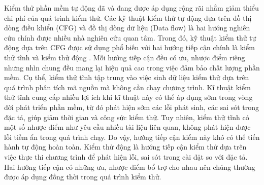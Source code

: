 Kiểm thử phần mềm tự động đã và đang được áp dụng rộng rãi nhằm giảm thiểu chi phí của quá trình kiểm thử. Các kỹ thuật kiểm thử tự động dựa trên đồ thị dòng điều khiển (CFG) và đồ thị dòng dữ liệu (Data flow) là hai hướng nghiên cứu chính được nhiều nhà nghiên cứu quan tâm. Trong đó, kỹ thuật kiểm thử tự động dựa trên CFG được sử dụng phổ biến với hai hướng tiếp cận chính là kiểm thử tĩnh \cite{WARD:1989:TheStaticAnalysisofSafetyCriticalSoftwareUsingMALPAS, SecureProgrammingWithStaticAnalysis, Wichmann:1995:Industrialperspectiveonstaticanalysis, Buckle:1998:StaticAnalysisofSafetyCriticalSoftwareTechniquesToolsandExperiences} và kiểm thử động \cite{Grigorenko:1998:DynamicTesting}. Mỗi hướng tiếp cận đều có ưu, nhược điểm riêng nhưng nhìn chung đều mang lại hiệu quả cao trong việc đảm bảo chất lượng phần mềm. Cụ thể, kiểm thử tĩnh tập trung vào việc sinh dữ liệu kiểm thử dựa trên quá trình phân tích mã nguồn mà không cần chạy chương trình. Kĩ thuật kiểm thử tĩnh cung cấp nhiều lợi ích khi kĩ thuật này có thể áp dụng sớm trong vòng đời phát triển phần mềm, từ đó phát hiện sớm các lỗi phát sinh, các sai sót trong đặc tả, giúp giảm thời gian và công sức kiểm thử. Tuy nhiên, kiểm thử tĩnh có một số nhược điểm như yêu cầu nhiều tài liệu liên quan, không phát hiện được lỗi tiềm ẩn trong quá trình chạy. Do vậy, hướng tiếp cận kiểm này khó có thể tiến hành tự động hoàn toàn. Kiểm thử động là hướng tiếp cận kiểm thử dựa trên việc thực thi chương trình để phát hiện lỗi, sai sót trong cài đặt so với đặc tả. Hai hướng tiếp cận có những ưu, nhược điểm bổ trợ cho nhau nên chúng thường được áp dụng đồng thời trong quá trình kiểm thử. 


